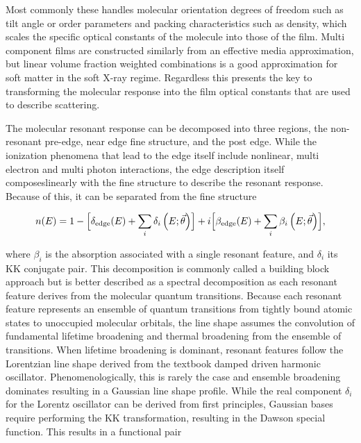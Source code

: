 Most commonly these handles molecular orientation degrees of freedom such as tilt angle or order parameters and packing characteristics such as density, which scales the specific optical constants of the molecule into those of the film. Multi component films are constructed similarly from an effective media approximation, but linear volume fraction weighted combinations is a good approximation for soft matter in the soft X-ray regime. Regardless this presents the key to transforming the molecular response into the film optical constants that are used to describe scattering.

The molecular resonant response can be decomposed into three regions, the non-resonant pre-edge, near edge fine structure, and the post edge. While the ionization phenomena that lead to the edge itself include nonlinear, multi electron and multi photon interactions, the edge description itself composeslinearly with the fine structure to describe the resonant response. Because of this, it can be separated from the fine structure

\begin{equation}
  n(E) = 1 - \Bigl[ \delta_{\mathrm{edge}}(E) + \sum_{i}\delta_{i}\left( E;\vec{\theta} \right) \Bigr] + i\Bigl[ \beta_{\mathrm{edge}}(E) + \sum_{i}\beta_{i}\left( E;\vec{\theta} \right) \Bigr],
  \label{eq:sos-index}
\end{equation}

where \(\beta_{i}\) is the absorption associated with a single resonant feature, and \(\delta_{i}\) its KK conjugate pair. This decomposition is commonly called a building block approach but is better described as a spectral decomposition as each resonant feature derives from the molecular quantum transitions. Because each resonant feature represents an ensemble of quantum transitions from tightly bound atomic states to unoccupied molecular orbitals, the line shape assumes the convolution of fundamental lifetime broadening and thermal broadening from the ensemble of transitions.\autocite{stohrNEXAFSSpectroscopy1992} When lifetime broadening is dominant, resonant features follow the Lorentzian line shape derived from the textbook damped driven harmonic oscillator.\autocite{stohrNEXAFSSpectroscopy1992,kuzykNonlinearOpticsStudents2017} Phenomenologically, this is rarely the case and ensemble broadening dominates resulting in a Gaussian line shape profile. While the real component \(\delta_{i}\) for the Lorentz oscillator can be derived from first principles, Gaussian bases require performing the KK transformation, resulting in the Dawson special function. This results in a functional pair


